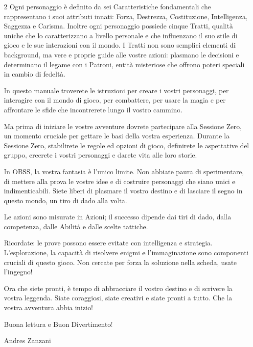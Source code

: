 \begin{multicols}{2}
Ogni personaggio è definito da sei Caratteristiche fondamentali che rappresentano i suoi attributi innati: Forza, Destrezza, Costituzione, Intelligenza, Saggezza e Carisma. Inoltre ogni personaggio possiede cinque Tratti, qualità uniche che lo caratterizzano a livello personale e che influenzano il suo stile di gioco e le sue interazioni con il mondo. I Tratti non sono semplici elementi di background, ma vere e proprie guide alle vostre azioni: plasmano le decisioni e determinano il legame con i Patroni, entità misteriose che offrono poteri speciali in cambio di fedeltà.

In questo manuale troverete le istruzioni per creare i vostri personaggi, per interagire con il mondo di gioco, per combattere, per usare la magia e per affrontare le sfide che incontrerete lungo il vostro cammino.

Ma prima di iniziare le vostre avventure dovrete partecipare alla Sessione Zero, un momento cruciale per gettare le basi della vostra esperienza. Durante la Sessione Zero, stabilirete le regole ed opzioni di gioco, definirete le aspettative del gruppo, creerete i vostri personaggi e darete vita alle loro storie.

In OBSS, la vostra fantasia è l'unico limite. Non abbiate paura di sperimentare, di mettere alla prova le vostre idee e di costruire personaggi che siano unici e indimenticabili. Siete liberi di plasmare il vostro destino e di lasciare il segno in questo mondo, un tiro di dado alla volta.

Le azioni sono misurate in Azioni; il successo dipende dai tiri di dado, dalla competenza, dalle Abilità e dalle scelte tattiche.

Ricordate: le prove possono essere evitate con intelligenza e strategia. L'esplorazione, la capacità di risolvere enigmi e l'immaginazione sono componenti cruciali di questo gioco. Non cercate per forza la soluzione nella scheda, usate l'ingegno!

Ora che siete pronti, è tempo di abbracciare il vostro destino e di scrivere la vostra leggenda. Siate coraggiosi, siate creativi e siate pronti a tutto. Che la vostra avventura abbia inizio!

\begin{center}
Buona lettura e Buon Divertimento!
\end{center}

\begin{flushright}
Andres Zanzani
\end{flushright}

\end{multicols}

